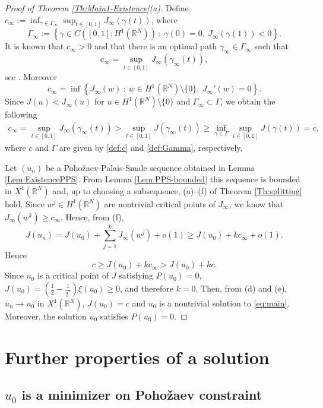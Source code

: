 \documentclass[12pt,leqno,twoside,sort]{amsart}
\newcommand{\R}{\mathbb{R}}
\numberwithin{equation}{section}
\begin{document}
\begin{proof}[Proof of Theorem \ref{Th:Main1-Existence}(a)]

Define $c_\infty := \inf_{\gamma \in \Gamma_\infty} \sup_{t \in [0,1]} J_\infty(\gamma(t))$, where
$$
\Gamma_\infty := \left\{ \gamma \in C([0,1]; H^1 (\R^N)) \ : \ \gamma(0) = 0, \ J_\infty(\gamma(1)) < 0 \right\}.
$$
It is known that $c_\infty > 0$ and that there is an optimal path $\gamma_\infty \in \Gamma_\infty$ such that
$$
c_\infty = \sup_{t\in [0,1]} J_\infty (\gamma_\infty(t)),
$$
see \cite{JeanjeanTanaka}. Moreover
$$
c_\infty = \inf \left\{ J_\infty(w) \ : \ w \in H^1 (\R^N) \setminus \{0\}, \ J_\infty'(w) = 0 \right\}.
$$
Since $J(u) < J_\infty(u)$ for $u \in H^1 (\R^N) \setminus \{0\}$ and $\Gamma_\infty \subset \Gamma$, we obtain the following
\begin{align*}
c_\infty = \sup_{t\in [0,1]} J_\infty (\gamma_\infty(t)) > \sup_{t\in [0,1]} J (\gamma_\infty(t)) \geq \inf_{\gamma \in \Gamma} \sup_{t\in[0,1]} J (\gamma(t)) = c,
\end{align*}
where $c$ and $\Gamma$ are given by \eqref{def:c} and \eqref{def:Gamma}, respectively. 



Let $(u_n)$ be a Poho\v{z}aev-Palais-Smale sequence obtained in Lemma \ref{Lem:ExistencePPS}. From Lemma \ref{Lem:PPS-bounded} this sequence is bounded in $X^1 (\R^N)$ and, up to choosing a subsequence, (a)--(f) of Theorem \ref{Th:splitting} hold. Since $w^j \in H^1 (\R^N)$ are nontrivial critical points of $J_\infty$, we know that $J_\infty(w^k) \geq c_\infty$. Hence, from (f),
$$
J(u_n) = J(u_0) + \sum_{j=1}^k J_\infty (w^j) + o(1) \geq J(u_0) + k c_\infty + o(1).
$$
Hence 
$$
c \geq J(u_0) + k c_\infty > J(u_0) + k c.
$$
Since $u_0$ is a critical point of $J$ satisfying $P(u_0) = 0$, $J(u_0) = \left( \frac12 - \frac{1}{2^*} \right) \xi(u_0) \geq 0$, and therefore $k = 0$. Then, from (d) and (e), $u_n \to u_0$ in $X^1 (\R^N)$, $J(u_0) = c$ and $u_0$ is a nontrivial solution to \eqref{eq:main}. Moreover, the solution $u_0$ satisfies $P(u_0) = 0$.
\end{proof}


\section{Further properties of a solution}\label{sect:6}

\subsection{\texorpdfstring{$u_0$}{u0} is a minimizer on Poho\v{z}aev constraint}
\end{document}
